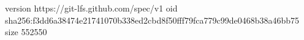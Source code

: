 version https://git-lfs.github.com/spec/v1
oid sha256:f3dd6a38474e21741070b338ed2cbd8f50fff79fca779c99de0468b38a46bb75
size 552550
